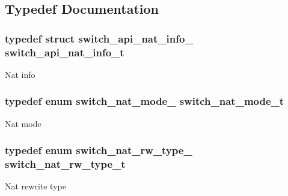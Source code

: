 \subsection{Typedef Documentation}
\hypertarget{group__NAT_ga733f3ff07128e89619717abae4059dc1}{
\subsubsection[{switch\+\_\+api\+\_\+nat\+\_\+info\+\_\+t}]{\setlength{\rightskip}{0pt plus 5cm}typedef struct {\bf switch\+\_\+api\+\_\+nat\+\_\+info\+\_\+}  {\bf switch\+\_\+api\+\_\+nat\+\_\+info\+\_\+t}}}\label{group__NAT_ga733f3ff07128e89619717abae4059dc1}
Nat info \hypertarget{group__NAT_gaa9738ba923f6bdce6435354dd82f664a}{
\subsubsection[{switch\+\_\+nat\+\_\+mode\+\_\+t}]{\setlength{\rightskip}{0pt plus 5cm}typedef enum {\bf switch\+\_\+nat\+\_\+mode\+\_\+}  {\bf switch\+\_\+nat\+\_\+mode\+\_\+t}}}\label{group__NAT_gaa9738ba923f6bdce6435354dd82f664a}
Nat mode \hypertarget{group__NAT_gae9df51650a50efc09ec777885d4ae142}{
\subsubsection[{switch\+\_\+nat\+\_\+rw\+\_\+type\+\_\+t}]{\setlength{\rightskip}{0pt plus 5cm}typedef enum {\bf switch\+\_\+nat\+\_\+rw\+\_\+type\+\_\+}  {\bf switch\+\_\+nat\+\_\+rw\+\_\+type\+\_\+t}}}\label{group__NAT_gae9df51650a50efc09ec777885d4ae142}
Nat rewrite type 

